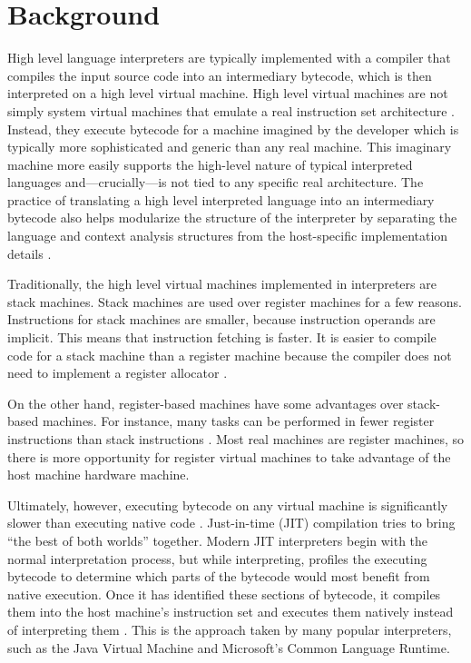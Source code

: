 	\section{Background}
		High level language interpreters are typically implemented with a compiler that compiles the input source code into an intermediary bytecode, which is then interpreted on a high level virtual machine. High level virtual machines are not simply system virtual machines that emulate a real instruction set architecture \citep{smithvmarticle}. Instead, they execute bytecode for a machine imagined by the developer which is typically more sophisticated and generic than any real machine. This imaginary machine more easily supports the high-level nature of typical interpreted languages and---crucially---is not tied to any specific real architecture. The practice of translating a high level interpreted language into an intermediary bytecode also helps modularize the structure of the interpreter by separating the language and context analysis structures from the host-specific implementation details \citep{structureinterpreters}.
	
		Traditionally, the high level virtual machines implemented in interpreters are stack machines. Stack machines are used over register machines for a few reasons. Instructions for stack machines are smaller, because instruction operands are implicit. This means that instruction fetching is faster. It is easier to compile code for a stack machine than a register machine because the compiler does not need to implement a register allocator \citep{caseregistervm}.
	
		On the other hand, register-based machines have some advantages over stack-based machines. For instance, many tasks can be performed in fewer register instructions than stack instructions \citep{caseregistervm}. Most real machines are register machines, so there is more opportunity for register virtual machines to take advantage of the host machine hardware machine. 
		
		Ultimately, however, executing bytecode on any virtual machine is significantly slower than executing native code \citep{optimizingindirectbranch}. Just-in-time (JIT) compilation tries to bring ``the best of both worlds'' together. Modern JIT interpreters begin with the normal interpretation process, but while interpreting, profiles the executing bytecode to determine which parts of the bytecode would most benefit from native execution. Once it has identified these sections of bytecode, it compiles them into the host machine's instruction set and executes them natively instead of interpreting them \citep{historyjit}. This is the approach taken by many popular interpreters, such as the Java Virtual Machine and Microsoft's Common Language Runtime.
		
